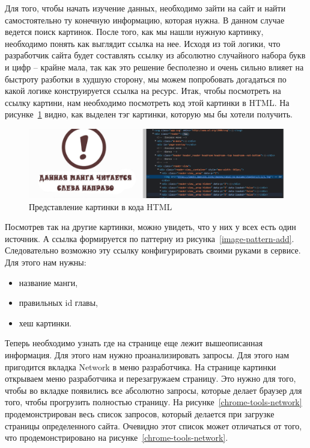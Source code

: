 Для того, чтобы начать изучение данных, необходимо зайти на сайт и найти самостоятельно ту конечную информацию, которая нужна. 
В данном случае ведется поиск картинок.
После того, как мы нашли нужную картинку, необходимо понять как выглядит ссылка на нее.
Исходя из той логики, что разработчик сайта будет составлять ссылку из абсолютно случайного набора букв и цифр -- крайне мала, так как это решение бесполезно и очень сильно влияет на быстроту разботки в худшую сторону,
мы можем попробовать догадаться по какой логике конструируется ссылка на ресурс. Итак, чтобы посмотреть на ссылку картини, нам необходимо посмотреть код этой картинки в HTML.
На рисунке~\ref{chrome-tools-image-tag-pic} видно, как выделен тэг картинки, которую мы бы хотели получить. 

\begin{figure}
    \includegraphics[scale=0.5]{imgs/chrome-tools-image-tag}
    \caption{Представление картинки в кода HTML}
    \label{chrome-tools-image-tag-pic}
\end{figure}

Посмотрев так на другие картинки, можно увидеть, что у них у всех есть один источник.
А ссылка формируется по паттерну из рисунка~\ref{image-pattern-add}. Следовательно возможно эту ссылку конфигурировать своими руками в сервисе.
Для этого нам нужны:

\begin{itemize}
    \item название манги,
    \item правильных id главы,
    \item хеш картинки.
\end{itemize}

Теперь необходимо узнать где на странице еще лежит вышеописанная информация. Для этого нам нужно проанализировать запросы.
Для этого нам пригодится вкладка Network в меню разработчика.
На странице картинки открываем меню разработчика и перезагружаем страницу.
Это нужно для того, чтобы во вкладке появились все абсолютно запросы, которые делает браузер для того, чтобы прогрузить полностью страницу.
На рисунке~\ref{chrome-tools-network} продемонстрирован весь список запросов, который делается при загрузке страницы определенного сайта.
Очевидно этот список может отличаться от того, что продемонстрировано на рисунке~\ref{chrome-tools-network}.

